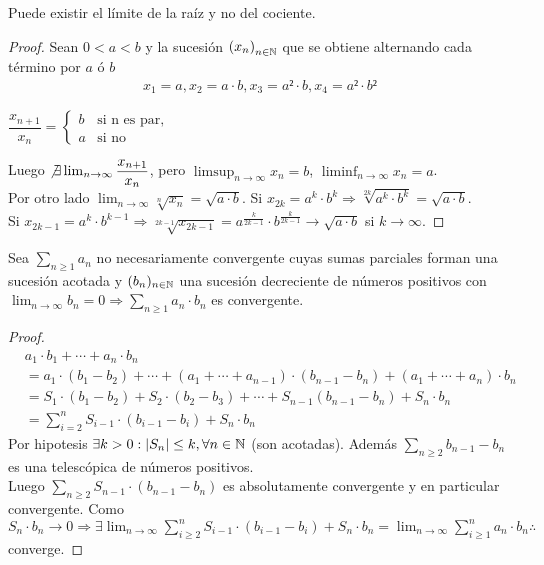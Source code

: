 \begin{eg}
  Puede existir el límite de la raíz y no del cociente.
  \begin{proof}
    Sean \(0 < a < b\) y la sucesión \({(x_n)}_{n \in \mathbb{N}} \) que se obtiene alternando cada término por \(a\) ó \(b\) \begin{align*}
      x_1 = a, x_2 = a \cdot b, x_3 = a² \cdot b, x_4 = a² \cdot b²
    \end{align*}

    \(\dfrac{x_{n+1}}{x_n} = \begin{cases}
        b & \text{si n es par}, \\
        a & \text{si no}
      \end{cases} \)

    Luego \(\not \exists \lim_{n \to \infty} \dfrac{x_{n+1}}{x_n} \), pero \(\limsup_{n \to \infty} x_n = b\), \(\liminf_{n \to \infty} x_n = a\). \\
    Por otro lado \(\lim_{n \to \infty} \sqrt[n]{x_n} = \sqrt{a \cdot b} \). Si \(x_{2k} = a^k \cdot b^k \Rightarrow \sqrt[2k]{a^k \cdot b^k} = \sqrt{a \cdot b} \). \\
    Si \(x_{2k-1} = a^k \cdot b^{k-1} \Rightarrow \sqrt[2k-1]{x_{2k-1}} = a^{\frac{k}{2k-1}} \cdot b^{\frac{k}{2k-1}} \to \sqrt{a \cdot b} \) si \(k \to \infty\).
  \end{proof}
\end{eg}

\begin{theorem}[Dirichlet]
  Sea \(\sum_{n \geq 1} a_n\) no necesariamente convergente cuyas sumas parciales forman una sucesión acotada y \((b_n)_{n \in \mathbb{N}} \) una sucesión decreciente de números positivos con \(\lim_{n \to \infty} b_n = 0 \Rightarrow \sum_{n \geq 1} a_n \cdot b_n\) es convergente.

  \begin{proof}
    \begin{align*}
       & a_1 \cdot b_1 + \cdots + a_n \cdot b_n                                                                                \\
       & = a_1 \cdot (b_1 - b_2) +  \cdots + (a_1 + \cdots + a_{n-1}) \cdot (b_{n-1} - b_n) + (a_1 + \cdots + a_n) \cdot b_n \\
       & = S_1 \cdot (b_1 - b_2) + S_2 \cdot (b_2 - b_3) + \cdots + S_{n-1} (b_{n-1} - b_n) + S_n \cdot b_n                  \\
       & = \sum_{i = 2}^n S_{i-1} \cdot (b_{i-1} - b_i) + S_n \cdot b_n
    \end{align*}
    Por hipotesis \(\exists k > 0 : |S_n| \leq k, \forall n \in \mathbb{N} \) (son acotadas). Además \(\sum_{n \geq 2} b_{n-1} - b_n\) es una telescópica de números positivos. \\
    Luego \(\sum_{n \geq 2} S_{n-1} \cdot (b_{n-1} - b_n)\) es absolutamente convergente y en particular convergente.
    Como \(S_n \cdot b_n \to 0 \Rightarrow \exists \lim_{n \to \infty} \sum_{i \geq 2}^n S_{i-1} \cdot (b_{i-1} - b_i) + S_n \cdot b_n = \lim_{n \to \infty} \sum_{i \geq 1}^n a_n \cdot b_n \therefore \) converge.
  \end{proof}
\end{theorem}

